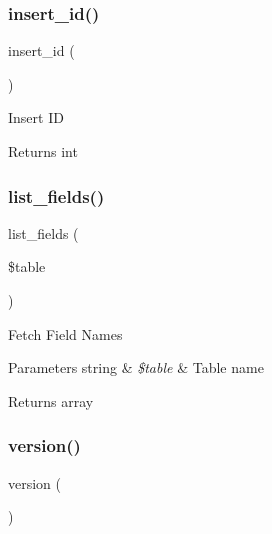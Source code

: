 \subsubsection{\texorpdfstring{insert\+\_\+id()}{insert\_id()}}
{\footnotesize\ttfamily insert\+\_\+id (\begin{DoxyParamCaption}{ }\end{DoxyParamCaption})}

Insert ID

\begin{DoxyReturn}{Returns}
int 
\end{DoxyReturn}
\mbox{\label{class_c_i___d_b__sqlite3__driver_aef08cd376b16b24608100ca0e3f2f85b}} 
\subsubsection{\texorpdfstring{list\+\_\+fields()}{list\_fields()}}
{\footnotesize\ttfamily list\+\_\+fields (\begin{DoxyParamCaption}\item[{}]{\$table }\end{DoxyParamCaption})}

Fetch Field Names


\begin{DoxyParams}[1]{Parameters}
string & {\em \$table} & Table name \\
\hline
\end{DoxyParams}
\begin{DoxyReturn}{Returns}
array 
\end{DoxyReturn}
\mbox{\label{class_c_i___d_b__sqlite3__driver_a6080dae0886626b9a4cedb29240708b1}} 
\subsubsection{\texorpdfstring{version()}{version()}}
{\footnotesize\ttfamily version (\begin{DoxyParamCaption}{ }\end{DoxyParamCaption})}

